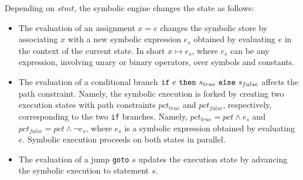 \noindent Depending on $stmt$, the symbolic engine changes the state as follows:
\begin{itemize}
  \item The evaluation of an assignment $x=e$ changes the symbolic store by associating $x$ with a new symbolic expression $e_s$ obtained by evaluating $e$ in the context of the current state. In short $x\mapsto e_s$, where $e_s$ can be any expression, involving unary or binary operators, over symbols and constants.
  

  \item The evaluation of a conditional branch ${\tt if}~e~{\tt then}~s_{true}~{\tt else}~s_{false}$ affects the path constraint. Namely, the symbolic execution is forked by creating two execution states with path constraints $pct_{true}$ and $pct_{false}$, respectively, corresponding to the two {\tt if} branches. Namely, $pct_{true}=pct \wedge e_s$ and $pct_{false}=pct \wedge \neg e_s$, where $e_s$ is a symbolic expression obtained by evaluating $e$. 
    Symbolic execution proceeds on both states in parallel.

  \item The evaluation of a jump {\tt goto} $s$ updates the execution state by advancing the symbolic execution to statement $s$. 
\end{itemize}



